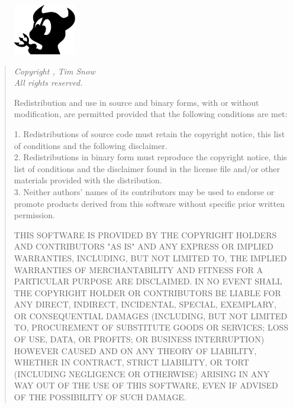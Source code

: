 \documentclass[a4paper]{article}
\begin{document}
			\begin{figure}[ht!]
				\centering
				\includegraphics[height=6em]{Graphics/BSD}
			\end{figure}

			\begin{quote}
				{\it
					Copyright , Tim Snow\\
					All rights reserved.

					Redistribution and use in source and binary forms, with or without modification, are permitted provided that the following conditions are met:

					1. Redistributions of source code must retain the copyright notice, this list of conditions and the following disclaimer.\\
					2. Redistributions in binary form must reproduce the copyright notice, this list of conditions and the disclaimer found in the license file and/or other materials provided with the distribution.\\
					3. Neither authors' names of its contributors may be used to endorse or promote products derived from this software without specific prior written permission.

					THIS SOFTWARE IS PROVIDED BY THE COPYRIGHT HOLDERS AND CONTRIBUTORS "AS IS" AND ANY EXPRESS OR IMPLIED WARRANTIES, INCLUDING, BUT NOT LIMITED TO, THE IMPLIED WARRANTIES OF MERCHANTABILITY AND FITNESS FOR A PARTICULAR PURPOSE ARE DISCLAIMED. IN NO EVENT SHALL THE COPYRIGHT HOLDER OR CONTRIBUTORS BE LIABLE FOR ANY DIRECT, INDIRECT, INCIDENTAL, SPECIAL, EXEMPLARY, OR CONSEQUENTIAL DAMAGES (INCLUDING, BUT NOT LIMITED TO, PROCUREMENT OF SUBSTITUTE GOODS OR SERVICES; LOSS OF USE, DATA, OR PROFITS; OR BUSINESS INTERRUPTION) HOWEVER CAUSED AND ON ANY THEORY OF LIABILITY, WHETHER IN CONTRACT, STRICT LIABILITY, OR TORT (INCLUDING NEGLIGENCE OR OTHERWISE) ARISING IN ANY WAY OUT OF THE USE OF THIS SOFTWARE, EVEN IF ADVISED OF THE POSSIBILITY OF SUCH DAMAGE.
				}
			\end{quote}
\end{document}
